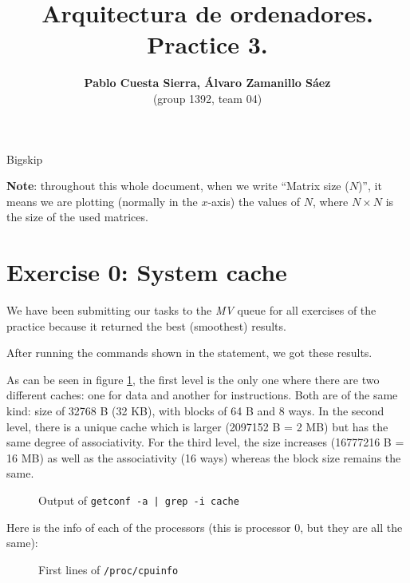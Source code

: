 \documentclass{article}
\begin{document}
\title{\textbf{Arquitectura de ordenadores. Practice 3.}}
\author{\textbf{Pablo Cuesta Sierra, Álvaro Zamanillo Sáez}\\(group 1392, team 04)}
\maketitle

\begin{tcolorbox}
\tableofcontents
\end{tcolorbox}

Bigskip

\textbf{Note}: throughout this whole document, when we write ``Matrix size ($N$)'', it means we are plotting (normally in the $x$-axis) the values of $N$, where $N\times N$ is the size of the used matrices.

\pagebreak

\section*{Exercise 0: System cache}

We have been submitting our tasks to the \emph{MV} queue for all exercises of the practice because it returned the best (smoothest) results. 

After running the commands shown in the statement, we got these results. 

As can be seen in figure \ref{cache_conf}, the first level is the only one where there are two different caches: one for data and another for instructions. Both are of the same kind: size of 32768 B (32 KB), with blocks of 64 B and 8 ways. 
In the second level, there is a unique cache which is larger (2097152 B = 2 MB) but has the same degree of associativity. For the third level, the size increases (16777216 B = 16 MB) as well as the associativity (16 ways) whereas the block size remains the same.

\begin{figure}[h]
    
    \centering
    \caption{Output of \texttt{getconf -a | grep -i cache}}
    \label{cache_conf}
\end{figure}

Here is the info of each of the processors (this is processor 0, but they are all the same):

\begin{figure}[h]
    
    \centering
    \caption{First lines of \texttt{/proc/cpuinfo}}
    \label{cpuinfo}
\end{figure}
\end{document}

